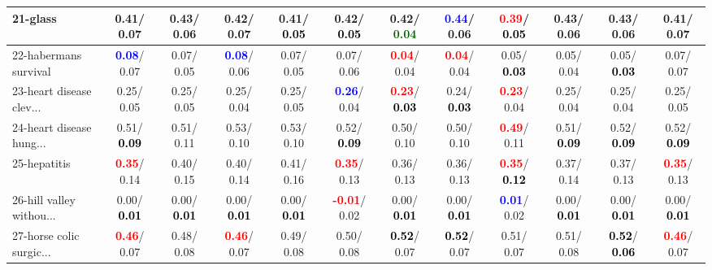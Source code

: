\begin{table}[h]
\begin{center}
{\begin{tabular}{lc|c|c|c|c|c|c|c|c|c|c}
21-glass &   0.41/  0.07 &   0.43/  0.06 &   0.42/  0.07 &   0.41/\textcolor{black}{\textbf{  0.05}} &   0.42/\textcolor{black}{\textbf{  0.05}} &   0.42/\textcolor{darkgreen}{\textbf{  0.04}} & \textcolor{blue}{\textbf{  0.44}}/  0.06 & \textcolor{red}{\textbf{  0.39}}/\textcolor{black}{\textbf{  0.05}} &   0.43/  0.06 &   0.43/  0.06 &   0.41/  0.07 \\ \hline
22-habermans survival & \textcolor{blue}{\textbf{  0.08}}/  0.07 &   0.07/  0.05 & \textcolor{blue}{\textbf{  0.08}}/  0.06 &   0.07/  0.05 &   0.07/  0.06 & \textcolor{red}{\textbf{  0.04}}/  0.04 & \textcolor{red}{\textbf{  0.04}}/  0.04 &   0.05/\textcolor{black}{\textbf{  0.03}} &   0.05/  0.04 &   0.05/\textcolor{black}{\textbf{  0.03}} &   0.07/  0.07 \\
23-heart disease clev... &   0.25/  0.05 &   0.25/  0.05 &   0.25/  0.04 &   0.25/  0.05 & \textcolor{blue}{\textbf{  0.26}}/  0.04 & \textcolor{red}{\textbf{  0.23}}/\textcolor{black}{\textbf{  0.03}} &   0.24/\textcolor{black}{\textbf{  0.03}} & \textcolor{red}{\textbf{  0.23}}/  0.04 &   0.25/  0.04 &   0.25/  0.04 &   0.25/  0.05 \\
24-heart disease hung... &   0.51/\textcolor{black}{\textbf{  0.09}} &   0.51/  0.11 &   0.53/  0.10 &   0.53/  0.10 &   0.52/\textcolor{black}{\textbf{  0.09}} &   0.50/  0.10 &   0.50/  0.10 & \textcolor{red}{\textbf{  0.49}}/  0.11 &   0.51/\textcolor{black}{\textbf{  0.09}} &   0.52/\textcolor{black}{\textbf{  0.09}} &   0.52/\textcolor{black}{\textbf{  0.09}} \\
25-hepatitis & \textcolor{red}{\textbf{  0.35}}/  0.14 &   0.40/  0.15 &   0.40/  0.14 &   0.41/  0.16 & \textcolor{red}{\textbf{  0.35}}/  0.13 &   0.36/  0.13 &   0.36/  0.13 & \textcolor{red}{\textbf{  0.35}}/\textcolor{black}{\textbf{  0.12}} &   0.37/  0.14 &   0.37/  0.13 & \textcolor{red}{\textbf{  0.35}}/  0.13 \\
26-hill valley withou... &   0.00/\textcolor{black}{\textbf{  0.01}} &   0.00/\textcolor{black}{\textbf{  0.01}} &   0.00/\textcolor{black}{\textbf{  0.01}} &   0.00/\textcolor{black}{\textbf{  0.01}} & \textcolor{red}{\textbf{ -0.01}}/  0.02 &   0.00/\textcolor{black}{\textbf{  0.01}} &   0.00/\textcolor{black}{\textbf{  0.01}} & \textcolor{blue}{\textbf{  0.01}}/  0.02 &   0.00/\textcolor{black}{\textbf{  0.01}} &   0.00/\textcolor{black}{\textbf{  0.01}} &   0.00/\textcolor{black}{\textbf{  0.01}} \\
27-horse colic surgic... & \textcolor{red}{\textbf{  0.46}}/  0.07 &   0.48/  0.08 & \textcolor{red}{\textbf{  0.46}}/  0.07 &   0.49/  0.08 &   0.50/  0.08 & \textcolor{black}{\textbf{  0.52}}/  0.07 & \textcolor{black}{\textbf{  0.52}}/  0.07 &   0.51/  0.07 &   0.51/  0.08 & \textcolor{black}{\textbf{  0.52}}/\textcolor{black}{\textbf{  0.06}} & \textcolor{red}{\textbf{  0.46}}/  0.07 \\

\end{tabular}}
\end{center}
\end{table}
